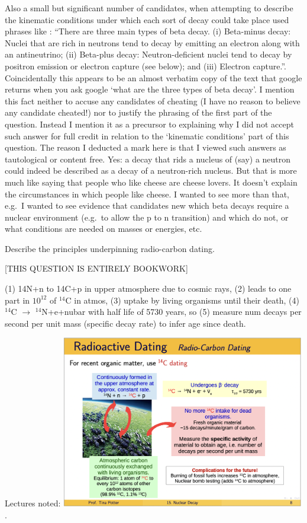 \documentclass[txfonts]{NSTexam}
\newcommand\ANS[1]{{

\answer %


{\color{blue}
#1
}
 
\endanswer

}}
\begin{document}
\begin{questions}
{{ Also a small but significant number of candidates, when attempting to describe the kinematic conditions under which each sort of decay could take place used phrases like :
 ``There are three main types of beta decay.
 (i) Beta-minus decay: Nuclei that are rich in neutrons tend to decay by emitting an electron along with an antineutrino; (ii)
 Beta-plus decay: Neutron-deficient nuclei tend to decay by positron emission or electron capture (see below); and (iii)
 Electron capture.''.  Coincidentally this appears to be an almost verbatim copy of the text that google returns when you ask google `what are the three types of beta decay'. I mention this fact neither to accuse any candidates of cheating (I have no reason to believe any candidate cheated!) nor to justify the phrasing of the first part of the question. Instead I mention it as a precursor to explaining why I  did not accept such answer for full credit in relation to the `kinematic conditions' part of this question. The reason I deducted a mark here is that I viewed such answers as tautological or content free. Yes: a decay that rids a nucleus of (say) a neutron could indeed be described as a decay of a neutron-rich nucleus.  But that is more much like saying that people who like cheese are cheese lovers. It doesn't explain the circumstances in which people like cheese. I wanted to see more than that, e.g.~I wanted to see evidence that candidates new which beta decays require a nuclear environment (e.g.~to allow the p to n transition) and which do not, or what conditions are needed on masses or energies, etc.}
 

}

\question
Describe the principles underpinning radio-carbon dating.

\ANS{

[THIS QUESTION IS ENTIRELY BOOKWORK]

(1) 14N+n to 14C+p in upper atmosphere due to cosmic rays, (2) leads to one part in $10^{12}$ of ${}^{14}$C in atmos, (3) uptake by living organisms until their death, (4) ${}^{14}$C $\rightarrow$ ${}^{14}$N+e+nubar with half life of 5730 years, so (5) measure num decays per second per unit mass (specific decay rate) to infer age since death.  

Lectures noted:
\includegraphics[width=0.8\textwidth]{Images/potter_nuclear_slide_8.png}.

}
\end{questions}
\end{document}
